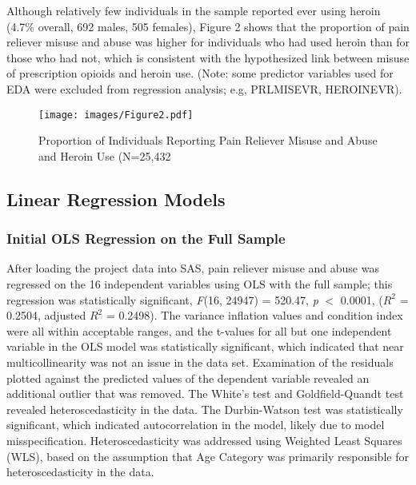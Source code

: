 \documentclass[sigconf]{acmart}
\begin{document}
Although relatively few individuals in the sample reported ever using heroin 
(4.7\% overall, 692 males, 505 females), Figure 2 shows that the proportion of 
pain reliever misuse and abuse was higher for individuals who had used heroin 
than for those who had not, which is consistent with the hypothesized link 
between misuse of prescription opioids and heroin use. (Note: some predictor 
variables used for EDA were excluded from regression analysis;
e.g, PRLMISEVR, HEROINEVR). 

\begin{figure}[!ht]
  \centering\texttt{[image: images/Figure2.pdf]}
  \caption{Proportion of Individuals Reporting Pain Reliever Misuse
  and Abuse and Heroin Use (N=25,432}
  \label{f:Figure2}
\end{figure}



\subsection{Linear Regression Models}

\subsubsection{Initial OLS Regression on the Full Sample} 
 
After loading the project data into SAS, pain reliever misuse and abuse was 
regressed on the 16 independent variables using OLS with the full sample; 
this regression was statistically significant, \textit{F}(16, 24947) = 
520.47, \textit{p} $<$ 0.0001, ($R^2$ = 0.2504, adjusted $R^2$ = 0.2498). The 
variance inflation values and condition index were all within acceptable ranges, 
and the t-values for all but one independent variable in the OLS model was 
statistically significant, which indicated that near multicollinearity was not 
an issue in the data set. Examination of the residuals plotted against the 
predicted values of the dependent variable revealed an additional outlier 
that was removed. The White’s test and Goldfield-Quandt test revealed 
heteroscedasticity in the data. The Durbin-Watson test was statistically 
significant, which indicated autocorrelation in the model, likely due to 
model misspecification. Heteroscedasticity was addressed using Weighted 
Least Squares (WLS), based on the assumption that Age Category was primarily 
responsible for heteroscedasticity in the data. 
\end{document}
